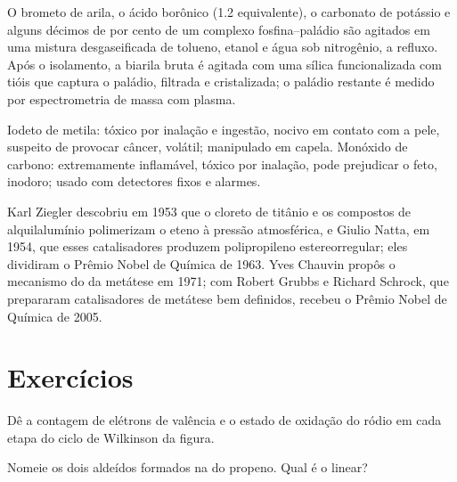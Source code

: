 \begin{inthelab}
O brometo de arila, o ácido borônico (1.2 equivalente), o carbonato de potássio e
alguns décimos de por cento de um complexo fosfina--paládio são agitados em uma
mistura desgaseificada de tolueno, etanol e água sob nitrogênio, a refluxo. Após o
isolamento, a biarila bruta é agitada com uma sílica funcionalizada com tióis que
captura o paládio, filtrada e cristalizada; o paládio restante é medido por
espectrometria de massa com plasma.
\end{inthelab}

\begin{safety}{}
Iodeto de metila: tóxico por inalação e ingestão, nocivo em contato com a pele, suspeito de
provocar câncer, volátil; manipulado em capela. Monóxido de carbono: extremamente
inflamável, tóxico por inalação, pode prejudicar o feto, inodoro; usado
com detectores fixos e alarmes.
\end{safety}

\begin{history}
Karl Ziegler descobriu em 1953 que o cloreto de titânio e os compostos de alquilalumínio
polimerizam o eteno à pressão atmosférica, e Giulio Natta, em 1954, que esses
catalisadores produzem polipropileno estereorregular; eles dividiram o Prêmio Nobel de
Química de 1963. Yves Chauvin propôs o mecanismo do  da
metátese em 1971; com Robert Grubbs e Richard Schrock, que prepararam catalisadores de
metátese bem definidos, recebeu o Prêmio Nobel de Química de 2005.
\end{history}

\section{Exercícios}

\begin{exercise}[$\star$]\label{exo:b3:homogeneous-catalysis:1}
Dê a contagem de elétrons de valência e o estado de oxidação do ródio em cada etapa
do ciclo de Wilkinson da figura.
\end{exercise}

\begin{exercise}[$\star$]\label{exo:b3:homogeneous-catalysis:2}
Nomeie os dois aldeídos formados na  do propeno. Qual é o
linear?
\end{exercise}


